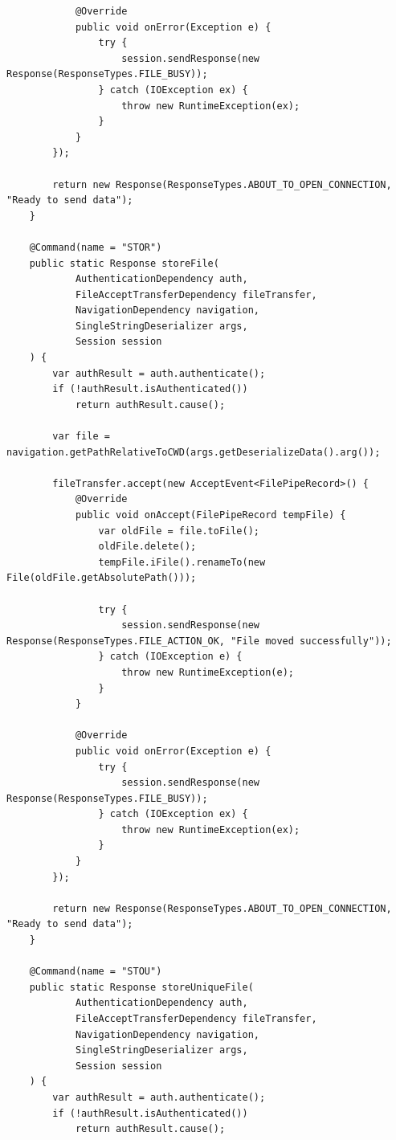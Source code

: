\documentclass[a4paper,14pt]{extarticle}
\begin{document}
\begin{verbatim}
            @Override
            public void onError(Exception e) {
                try {
                    session.sendResponse(new Response(ResponseTypes.FILE_BUSY));
                } catch (IOException ex) {
                    throw new RuntimeException(ex);
                }
            }
        });

        return new Response(ResponseTypes.ABOUT_TO_OPEN_CONNECTION, "Ready to send data");
    }

    @Command(name = "STOR")
    public static Response storeFile(
            AuthenticationDependency auth,
            FileAcceptTransferDependency fileTransfer,
            NavigationDependency navigation,
            SingleStringDeserializer args,
            Session session
    ) {
        var authResult = auth.authenticate();
        if (!authResult.isAuthenticated())
            return authResult.cause();

        var file = navigation.getPathRelativeToCWD(args.getDeserializeData().arg());

        fileTransfer.accept(new AcceptEvent<FilePipeRecord>() {
            @Override
            public void onAccept(FilePipeRecord tempFile) {
                var oldFile = file.toFile();
                oldFile.delete();
                tempFile.iFile().renameTo(new File(oldFile.getAbsolutePath()));

                try {
                    session.sendResponse(new Response(ResponseTypes.FILE_ACTION_OK, "File moved successfully"));
                } catch (IOException e) {
                    throw new RuntimeException(e);
                }
            }

            @Override
            public void onError(Exception e) {
                try {
                    session.sendResponse(new Response(ResponseTypes.FILE_BUSY));
                } catch (IOException ex) {
                    throw new RuntimeException(ex);
                }
            }
        });

        return new Response(ResponseTypes.ABOUT_TO_OPEN_CONNECTION, "Ready to send data");
    }

    @Command(name = "STOU")
    public static Response storeUniqueFile(
            AuthenticationDependency auth,
            FileAcceptTransferDependency fileTransfer,
            NavigationDependency navigation,
            SingleStringDeserializer args,
            Session session
    ) {
        var authResult = auth.authenticate();
        if (!authResult.isAuthenticated())
            return authResult.cause();


\end{verbatim}
\end{document}
